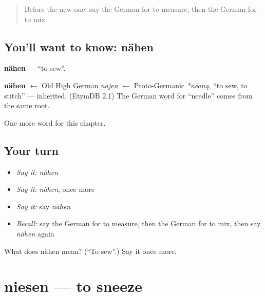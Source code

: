 \label{lesson:GE-C183-naehen}



\begin{quote}
Before the new one: say the German for to measure, then the German for to mix.
\end{quote}

\subsection*{You'll want to know: nähen}
\textbf{nähen} — \textquotedblleft{}to sew\textquotedblright{}.

\begin{cousinweb}
\textbf{nähen} $\leftarrow$ Old High German \emph{nājen} $\leftarrow$ Proto-Germanic \emph{*nēaną}, \textquotedblleft{}to sew, to stitch\textquotedblright{} — inherited. (EtymDB 2.1) The German word for \textquotedblleft{}needle\textquotedblright{} comes from the same root.
\end{cousinweb}

\begin{grammarlens}[title={What you've built}]
One more word for this chapter.
\end{grammarlens}

\subsection*{Your turn}
\begin{itemize}
\raggedright
  \item \emph{Say it:} \emph{nähen}
  \item \emph{Say it:} \emph{nähen}, once more
  \item \emph{Say it:} say \emph{nähen}
  \item \emph{Recall:} say the German for to measure, then the German for to mix, then say \emph{nähen} again
\end{itemize}

\begin{tcolorbox}[breakable,colback=teal!4,colframe=teal!35!black,title={Before you move on}]
What does nähen mean? (\textquotedblleft{}To sew\textquotedblright{}.) Say it once more.
\end{tcolorbox}
\section[niesen]{niesen — to sneeze}

\label{lesson:GE-C183-niesen}



